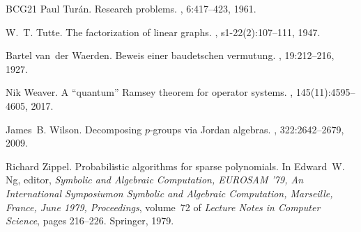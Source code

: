 \begin{thebibliography}{BCG{\etalchar{+}}21}
Paul Tur{\'a}n.
\newblock Research problems.
, 6:417--423, 1961.

W.~T. Tutte.
\newblock The factorization of linear graphs.
, s1-22(2):107--111,
  1947.

Bartel van~der Waerden.
\newblock Beweis einer baudetschen vermutung.
, 19:212--216, 1927.

Nik Weaver.
\newblock A ``quantum'' {Ramsey} theorem for operator systems.
,
  145(11):4595--4605, 2017.

James~B. Wilson.
\newblock Decomposing {$p$}-groups via {J}ordan algebras.
, 322:2642--2679, 2009.

Richard Zippel.
\newblock Probabilistic algorithms for sparse polynomials.
\newblock In Edward~W. Ng, editor, {\em Symbolic and Algebraic Computation,
  {EUROSAM} '79, An International Symposiumon Symbolic and Algebraic
  Computation, Marseille, France, June 1979, Proceedings}, volume~72 of {\em
  Lecture Notes in Computer Science}, pages 216--226. Springer, 1979.

\end{thebibliography}
